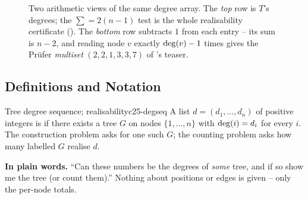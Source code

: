 \begin{figure}[H]
\centering
{}
\caption{Two arithmetic views of the same degree array. The \emph{top} row is $T$'s degrees; the
$\sum=2(n-1)$ test is the whole realisability certificate (). The \emph{bottom}
row subtracts $1$ from each entry -- its sum is $n-2$, and reading node $v$ exactly $\operatorname{deg}(v)-1$
times gives the Pr\"ufer \emph{multiset} $(2,2,1,3,3,7)$ of 's teaser.}\label{fig:c25-degrow}
\end{figure}

\subsection{Definitions and Notation}

\begin{definition}{Tree degree sequence; realisability}{c25-degseq}
A list $d=(d_1,\dots,d_n)$ of positive integers is  if there exists a tree
$G$ on nodes $\{1,\dots,n\}$ with $\operatorname{deg}(i)=d_i$ for every $i$. The construction problem asks for
one such $G$; the counting problem asks how many labelled $G$ realise $d$.
\end{definition}

\noindent\textbf{In plain words.} ``Can these numbers be the degrees of \emph{some} tree, and if so
show me the tree (or count them).'' Nothing about positions or edges is given -- only the per-node
totals.

